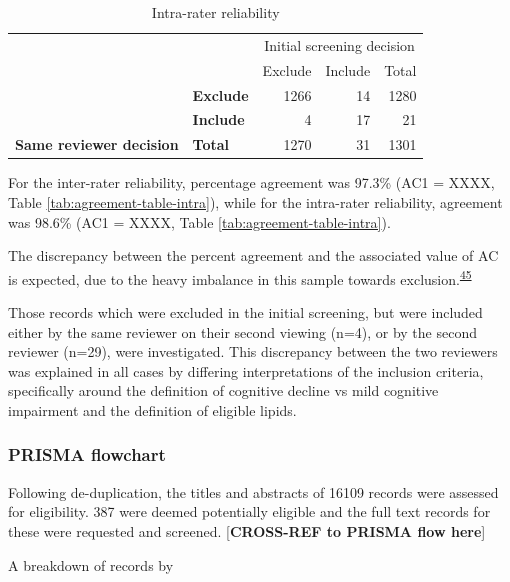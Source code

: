 \documentclass[a4paper, twoside]{templates/ociamthesis}
\begin{document}
\begin{table}

\caption{\label{tab:agreementtableintra}Intra-rater reliability}
\centering
\begin{tabular}[t]{>{}l>{}l|r>{}r|r}
\toprule
\multicolumn{2}{c}{ } & \multicolumn{3}{c}{Initial screening decision} \\
\cmidrule(l{3pt}r{3pt}){3-5}
 &  & Exclude & Include & Total\\
\midrule
 & \textbf{Exclude} & 1266 & 14 & 1280\\
\cmidrule{2-5}
 & \textbf{Include} & 4 & 17 & 21\\
\cmidrule{2-5}
\multirow{-3}{*}{\raggedright\arraybackslash \textbf{Same reviewer decision}} & \textbf{Total} & 1270 & 31 & 1301\\
\bottomrule
\end{tabular}
\end{table}

For the inter-rater reliability, percentage agreement was 97.3\% (AC1 = XXXX, Table \ref{tab:agreement-table-intra}), while for the intra-rater reliability, agreement was 98.6\% (AC1 = XXXX, Table \ref{tab:agreement-table-intra}).

The discrepancy between the percent agreement and the associated value of AC is expected, due to the heavy imbalance in this sample towards exclusion.\textsuperscript{\protect\hyperlink{ref-feinstein1990}{45}}

Those records which were excluded in the initial screening, but were included either by the same reviewer on their second viewing (n=4), or by the second reviewer (n=29), were investigated. This discrepancy between the two reviewers was explained in all cases by differing interpretations of the inclusion criteria, specifically around the definition of cognitive decline vs mild cognitive impairment and the definition of eligible lipids.

\hypertarget{prisma-flowchart}{%
\subsubsection{PRISMA flowchart}\label{prisma-flowchart}}

Following de-duplication, the titles and abstracts of 16109 records were assessed for eligibility. 387 were deemed potentially eligible and the full text records for these were requested and screened. {[}\textbf{CROSS-REF to PRISMA flow here}{]}

A breakdown of records by
\end{document}
